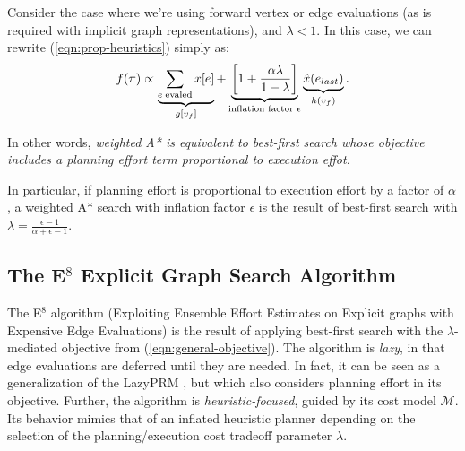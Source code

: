 Consider the case where we're using forward vertex or edge evaluations
(as is required with implicit graph representations),
and $\lambda < 1$.
In this case, we can rewrite (\ref{eqn:prop-heuristics})
simply as:
\begin{equation}
   f(\pi) \propto
   \underbrace{\sum_{e \; \mbox{\scriptsize evaled}} x[e]}_{g[v_f]}
   +
   \underbrace{\left[ 1 + \frac{\alpha \lambda}{1-\lambda} \right]}_{
      \mbox{\scriptsize inflation factor } \epsilon}
   \underbrace{\hat{x}(e_{last})}_{h(v_f)}
   .
\end{equation}

In other words,
\emph{weighted A* is equivalent to
   best-first search whose objective
   includes a planning effort term
   proportional to execution effot.}

In particular, if planning effort is proportional to execution
effort by a factor of $\alpha$,
a weighted A* search with inflation factor $\epsilon$
is the result of best-first search with
$\lambda = \frac{\epsilon-1}{\alpha+\epsilon-1}$.

\subsection{The E$^8$ Explicit Graph Search Algorithm}
\label{sec:e8-planner}

The E$^8$ algorithm
(Exploiting Ensemble Effort Estimates
on Explicit graphs with Expensive Edge Evaluations)
is the result of applying
best-first search with the $\lambda$-mediated objective
from (\ref{eqn:general-objective}).
The algorithm is \emph{lazy},
in that edge evaluations are deferred until they are needed.
In fact, it can be seen as a generalization of the
LazyPRM \cite{bohlin2000lazyprm},
but which also considers planning effort in its objective.
Further,
the algorithm is \emph{heuristic-focused},
guided by its cost model $\mathcal{M}$.
Its behavior mimics that of an inflated heuristic planner
depending on the selection of the planning/execution cost
tradeoff parameter $\lambda$.


